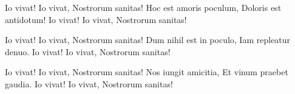 \begin{verse*}
Io vivat! Io vivat,
Nostrorum sanitas!
Hoc est amoris poculum,
Doloris est antidotum!
Io vivat! Io vivat,
Nostrorum sanitas!
\end{verse*}

\begin{verse*}
Io vivat! Io vivat,
Nostrorum sanitas!
Dum nihil est in poculo,
Iam repleatur denuo.
Io vivat! Io vivat,
Nostrorum sanitas!
\end{verse*}

\begin{verse*}
Io vivat! Io vivat,
Nostrorum sanitas!
Nos iungit amicitia,
Et vinum praebet gaudia.
Io vivat! Io vivat,
Nostrorum sanitas!
\end{verse*}
